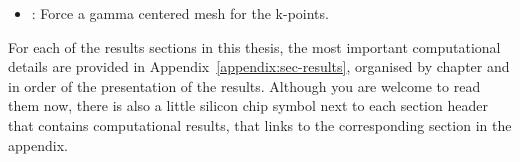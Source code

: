 \begin{refsection}
\begin{itemize}
\item {}: Force a gamma centered mesh for the k-points. 
 
\end{itemize} 
 
For each of the results sections in this thesis, the most important 
computational details are provided in Appendix~\ref{appendix:sec-results}, 
organised by chapter and in order of the presentation of the results. Although 
you are welcome to read them now, there is also a little silicon chip symbol 
next to each section header that contains computational results, that links to 
the corresponding section in the appendix.  

\clearpage
\pagestyle{biblio}
\printbibliography 

\end{refsection} 
